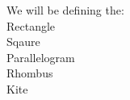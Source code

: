\documentclass[preview]{standalone}
\begin{document}
\begin{center}
We will be defining the: \\ Rectangle \\ Sqaure \\ Parallelogram \\ Rhombus \\ Kite
\end{center}
\end{document}
